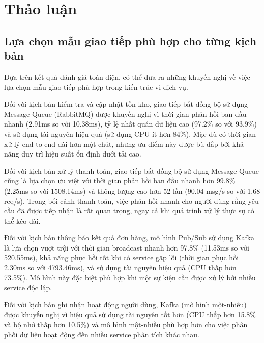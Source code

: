 \section{Thảo luận}

\subsection{Lựa chọn mẫu giao tiếp phù hợp cho từng kịch bản}
Dựa trên kết quả đánh giá toàn diện, có thể đưa ra những khuyến nghị về việc lựa chọn mẫu giao tiếp phù hợp trong kiến trúc vi dịch vụ.

Đối với kịch bản kiểm tra và cập nhật tồn kho, giao tiếp bất đồng bộ sử dụng Message Queue (RabbitMQ) được khuyến nghị vì thời gian phản hồi ban đầu nhanh (2.91ms so với 10.38ms), tỷ lệ nhất quán dữ liệu cao (97.2\% so với 93.9\%) và sử dụng tài nguyên hiệu quả (sử dụng CPU ít hơn 84\%). Mặc dù có thời gian xử lý end-to-end dài hơn một chút, nhưng ưu điểm này được bù đắp bởi khả năng duy trì hiệu suất ổn định dưới tải cao.

Đối với kịch bản xử lý thanh toán, giao tiếp bất đồng bộ sử dụng Message Queue cũng là lựa chọn ưu việt với thời gian phản hồi ban đầu nhanh hơn 99.8\% (2.25ms so với 1508.14ms) và thông lượng cao hơn 52 lần (90.04 msg/s so với 1.68 req/s). Trong bối cảnh thanh toán, việc phản hồi nhanh cho người dùng rằng yêu cầu đã được tiếp nhận là rất quan trọng, ngay cả khi quá trình xử lý thực sự có thể kéo dài.

Đối với kịch bản thông báo kết quả đơn hàng, mô hình Pub/Sub sử dụng Kafka là lựa chọn vượt trội với thời gian broadcast nhanh hơn 97.8\% (11.53ms so với 520.55ms), khả năng phục hồi tốt khi có service gặp lỗi (thời gian phục hồi 2.30ms so với 4793.46ms), và sử dụng tài nguyên hiệu quả (CPU thấp hơn 73.5\%). Mô hình này đặc biệt phù hợp khi một sự kiện cần được xử lý bởi nhiều service độc lập.

Đối với kịch bản ghi nhận hoạt động người dùng, Kafka (mô hình một-nhiều) được khuyến nghị vì hiệu quả sử dụng tài nguyên tốt hơn (CPU thấp hơn 15.8\% và bộ nhớ thấp hơn 10.5\%) và mô hình một-nhiều phù hợp hơn cho việc phân phối dữ liệu hoạt động đến nhiều service phân tích khác nhau.

